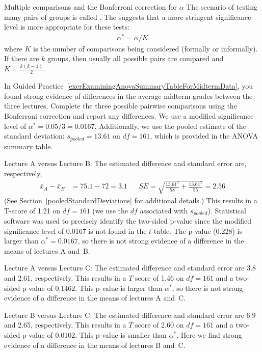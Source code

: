 \begin{onebox}{Multiple comparisons and the Bonferroni
    correction for $\alpha$}
  The scenario of testing many pairs of groups is called
  .
  The  suggests that a more
  stringent significance level is more appropriate for
  these tests:
  \begin{align*}
  \alpha^* = \alpha / K
  \end{align*}
  where $K$ is the number of comparisons being considered
  (formally or informally).
  If there are $k$ groups, then usually all possible pairs
  are compared and $K=\frac{k(k-1)}{2}$.
\end{onebox}

\begin{examplewrap}
\begin{nexample}{In Guided
    Practice~\ref{exerExaminingAnovaSummaryTableForMidtermData},
    you found strong evidence of differences in the average
    midterm grades between the three lectures.
    Complete the three possible pairwise comparisons using
    the Bonferroni correction and report any differences.}
  \label{multipleComparisonsOfThreeStatClasses}%
  We use a modified significance level of
  $\alpha^* = 0.05 / 3 = 0.0167$.
  Additionally, we use the pooled estimate of the standard
  deviation:
  $s_{pooled}=13.61$ on $df=161$,
  which is provided in the ANOVA summary table.

  Lecture A versus Lecture B:
  The estimated difference and standard error are,
  respectively,
  \begin{align*}
  \bar{x}_A - \bar{x}_{B} &= 75.1 - 72 = 3.1
  &&SE = \sqrt{\frac{13.61^2}{58} + \frac{13.61^2}{55}} = 2.56
  \end{align*}
  (See Section~\vref{pooledStandardDeviations}
  for additional details.)
  This results in a T-score of 1.21 on $df = 161$
  (we use the $df$ associated with $s_{pooled}$).
  Statistical software was used to precisely identify the two-sided
  p-value since the modified significance level of 0.0167 is not
  found in the $t$-table.
  The p-value (0.228) is larger than $\alpha^*=0.0167$,
  so there is not strong evidence of a difference in the means
  of lectures A and~B.

  Lecture A versus Lecture C: The estimated difference and
  standard error are 3.8 and 2.61, respectively.
  This results in a $T$ score of 1.46 on $df = 161$
  and a two-sided p-value of 0.1462.
  This p-value is larger than $\alpha^*$, so there is not
  strong evidence of a difference in the means of lectures
  A and~C.

  Lecture B versus Lecture C: The estimated difference
  and standard error are 6.9 and 2.65, respectively.
  This results in a $T$ score of 2.60 on $df = 161$
  and a two-sided p-value of 0.0102.
  This p-value is smaller than $\alpha^*$.
  Here we find strong evidence of a difference in the
  means of lectures B and~C.
\end{nexample}
\end{examplewrap}

